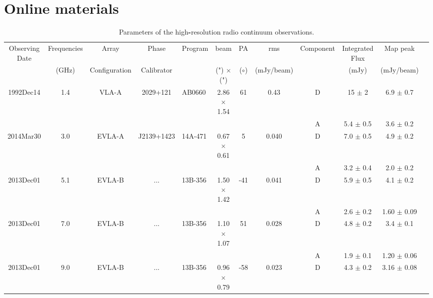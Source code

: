 \documentclass[]{aa} %
\begin{document}
\section{Online materials}
\twocolumn
{}
  \setlength{\tabcolsep}{0.01in}
  \begin{table*}
       \caption{Parameters of the high\textbf{-}resolution radio continuum observations. }
     \label{vladata}
  \begin{center}
  \begin{tabular}{c c c c l c c c c c c c}     %
  \hline\hline
    Observing Date & Frequencies & Array    & Phase      & Program     & beam &PA &rms &Component     & Integrated Flux       & Map peak               \\
                   &   (GHz)     & Configuration  &  Calibrator          &  & (") $\times$(")    & ($\circ$) & (mJy/beam) &    &   (mJy)               &(mJy/beam)              \\
      \hline
    1992Dec14      & 1.4        & VLA-A   &2029+121       & AB0660       & 2.86  $\times$1.54  &61& 0.43 &D          & 15 $\pm$ 2      & 6.9 $\pm$ 0.7    \\
                   &             &                &      &       &  & &&A          & 5.4 $\pm$ 0.5       & 3.6 $\pm$ 0.2    \\
    2014Mar30      & 3.0        & EVLA-A  &J2139+1423        & 14A-471     & 0.67 $\times$ 0.61&5& 0.040 &D          &7.0 $\pm$ 0.5       &4.9 $\pm$ 0.2    \\
                   &             &                &     &        &  && &A          & 3.2 $\pm$ 0.4      & 2.0 $\pm$ 0.2    \\
    2013Dec01      & 5.1        & EVLA-B  &...        & 13B-356       &1.50 $\times$ 1.42  &-41& 0.041& D          & 5.9 $\pm$ 0.5  & 4.1 $\pm$ 0.2    \\
                   &             &                &      &       & &&  &A          &2.6 $\pm$ 0.2     & 1.60 $\pm$ 0.09    \\
    2013Dec01      & 7.0        & EVLA-B  &...        & 13B-356     &1.10 $\times$ 1.07 &51&0.028 & D          & 4.8 $\pm$ 0.2       & 3.4 $\pm$ 0.1    \\
                   &             &                &      &       & && & A          & 1.9 $\pm$ 0.1       & 1.20 $\pm$ 0.06    \\
    2013Dec01      & 9.0        & EVLA-B   &...       & 13B-356     &0.96 $\times$ 0.79 &-58&0.023 & D          &4.3 $\pm$ 0.2       & 3.16 $\pm$ 0.08    \\

\end{tabular}
\end{center}
\end{table*}
\end{document}
